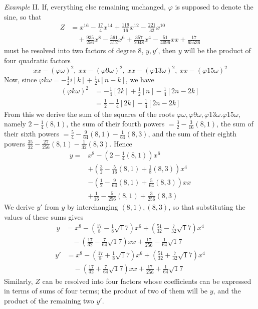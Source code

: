 \clearpage\textit{Example} II. If, everything else remaining unchanged, \(\varphi\) is supposed to denote the sine, so that \[\begin{aligned}Z&=x^{16}-\tfrac{17}4x^{14}+\tfrac{119}{16}x^{12}-\tfrac{221}{32}x^{10}\\&\quad+\tfrac{935}{256}x^8-\tfrac{561}{512}x^6+\tfrac{357}{2048}x^4-\tfrac{51}{4096}xx+\tfrac{17}{65536}\end{aligned}\] must be resolved into two factors of degree 8, \(y,\allowbreak y'\), then \(y\) will be the product of
four quadratic factors \[xx-(\varphi\omega)^2,\ xx-(\varphi9\omega)^2,\ xx-(\varphi13\omega)^2,\ xx-(\varphi15\omega)^2\] Now, since \(\varphi k\omega=-\tfrac12i[k]+\tfrac12i[n-k]\), we have \[\begin{aligned}(\varphi k\omega)^2&=-\tfrac14[2k]+\tfrac12[n]-\tfrac14[2n-2k]\\&=\tfrac12-\tfrac14[2k]-\tfrac14[2n-2k]\end{aligned}\] From this we derive the sum of the squares of the roots \(\varphi\omega,\allowbreak \varphi9\omega,\allowbreak \varphi13\omega.\varphi15\omega\), namely \(2-\tfrac14(8,1)\), the sum of their fourth powers \(=\tfrac32-\tfrac3{16}(8,1)\), the sum of their sixth powers \(=\tfrac54-\tfrac9{64}(8,1)-\tfrac1{64}(8,3)\), and the sum of their eighth powers \(\tfrac{35}{32}-\tfrac{27}{256}(8,1)-\tfrac1{32}(8,3)\). Hence \[\begin{aligned}y={}&x^8-(2-\tfrac14(8,1))x^6\\&+(\tfrac32-\tfrac5{16}(8,1)+\tfrac18(8,3))x^4\\&-(\tfrac12-\tfrac9{64}(8,1)+\tfrac5{64}(8,3))xx\\&+\tfrac1{16}-\tfrac5{256}(8,1)+\tfrac3{256}(8,3)\end{aligned}\] We derive \(y'\) from \(y\) by interchanging \((8,1),\allowbreak (8,3)\), so that substituting the values of these sums gives \[\begin{aligned}y&=x^8-(\tfrac{17}8-\tfrac18\surd17)x^6+(\tfrac{51}{32}-\tfrac7{32}\surd17)x^4\\&\quad-(\tfrac{17}{32}-\tfrac7{64}\surd17)xx+\tfrac{17}{256}-\tfrac1{64}\surd17\end{aligned}\] \[\begin{aligned}y'&=x^8-(\tfrac{17}8+\tfrac18\surd17)x^6+(\tfrac{51}{32}+\tfrac7{32}\surd17)x^4\\&\quad-(\tfrac{17}{32}+\tfrac7{64}\surd17)xx+\tfrac{17}{256}+\tfrac1{64}\surd17\end{aligned}\] Similarly, \(Z\) can be resolved into four factors whose coefficients can be expressed in terms of sums of four terms; the product of two of them will be \(y\), and the product of the remaining two \(y'\).


